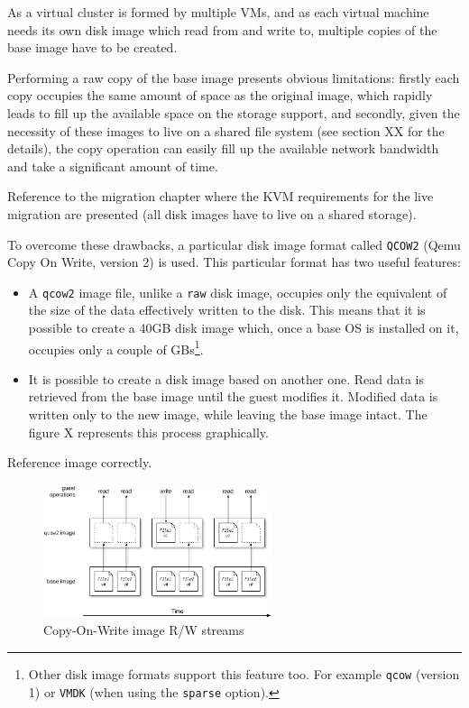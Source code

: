 As a virtual cluster is formed by multiple VMs, and as each virtual machine needs its own disk image which read from and write to, multiple copies of the base image have to be created.

Performing a raw copy of the base image presents obvious limitations: firstly each copy occupies the same amount of space as the original image, which rapidly leads to fill up the available space on the storage support, and secondly, given the necessity of these images to live on a shared file system (see section XX for the details), the copy operation can easily fill up the available network bandwidth and take a significant amount of time.

\begin{todo}
Reference to the migration chapter where the KVM requirements for the live migration are presented (all disk images have to live on a shared storage).
\end{todo}

To overcome these drawbacks, a particular disk image format called \texttt{QCOW2} (Qemu Copy On Write, version 2) is used. This particular format has two useful features:

\begin{itemize}
    \item A \texttt{qcow2} image file, unlike a \texttt{raw} disk image, occupies only the equivalent of the size of the data effectively written to the disk. This means that it is possible to create a 40GB disk image which, once a base OS is installed on it, occupies only a couple of GBs\footnote{Other disk image formats support this feature too. For example \texttt{qcow} (version 1) or \texttt{VMDK} (when using the \texttt{sparse} option).}.
    \item It is possible to create a disk image based on another one. Read data is retrieved from the base image until the guest modifies it. Modified data is written only to the new image, while leaving the base image intact. The figure X represents this process graphically.
\end{itemize}

\begin{todo}
Reference image correctly.
\end{todo}

\begin{figure}[h]
	\centering
	\includegraphics[width=0.6\textwidth]{figures/cow-images}
	\caption{Copy-On-Write image R/W streams}
	\label{fig:cow}
\end{figure}

